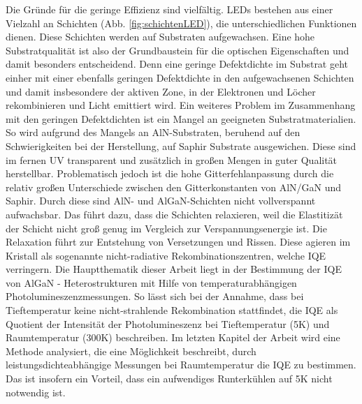 Die Gründe für die geringe Effizienz sind vielfältig. LEDs bestehen aus einer Vielzahl an Schichten (Abb. \ref{fig:schichtenLED}), die unterschiedlichen Funktionen dienen. Diese Schichten werden auf Substraten aufgewachsen. Eine hohe Substratqualität ist also der Grundbaustein für die optischen Eigenschaften und damit besonders entscheidend. Denn eine geringe Defektdichte im Substrat geht einher mit einer ebenfalls geringen Defektdichte in den aufgewachsenen Schichten und damit insbesondere der aktiven Zone, in der Elektronen und Löcher rekombinieren und Licht emittiert wird. Ein weiteres Problem im Zusammenhang mit den geringen Defektdichten ist ein Mangel an geeigneten Substratmaterialien. So wird aufgrund des Mangels an AlN-Substraten, beruhend auf den Schwierigkeiten bei der Herstellung, auf Saphir Substrate ausgewichen. Diese sind im fernen UV transparent und zusätzlich in großen Mengen in guter Qualität herstellbar. Problematisch jedoch ist die hohe Gitterfehlanpassung durch die relativ großen Unterschiede zwischen den Gitterkonstanten von AlN/GaN und Saphir. Durch diese sind AlN- und AlGaN-Schichten nicht vollverspannt aufwachsbar. Das führt dazu, dass die Schichten relaxieren, weil die Elastitizät der Schicht nicht groß genug im Vergleich zur Verspannungsenergie ist. Die Relaxation führt zur Entstehung von Versetzungen und Rissen. Diese agieren im Kristall als sogenannte nicht-radiative Rekombinationszentren, welche IQE verringern. Die Hauptthematik dieser Arbeit liegt in der  Bestimmung der IQE von AlGaN - Heterostrukturen mit Hilfe von temperaturabhängigen Photolumineszenzmessungen. So lässt sich bei der Annahme, dass bei Tieftemperatur keine nicht-strahlende Rekombination stattfindet, die IQE als Quotient der Intensität der Photolumineszenz bei Tieftemperatur (5K) und Raumtemperatur (300K) beschreiben. Im letzten Kapitel der Arbeit wird eine Methode analysiert, die eine Möglichkeit beschreibt, durch leistungsdichteabhängige Messungen bei Raumtemperatur die IQE zu bestimmen. Das ist insofern ein Vorteil, dass ein aufwendiges Runterkühlen auf 5K nicht notwendig ist. 














